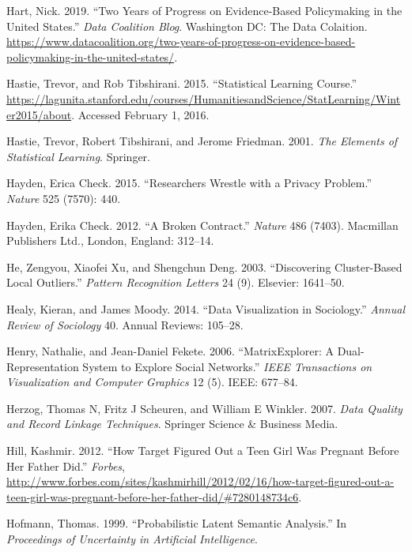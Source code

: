 \documentclass[]{krantz}
\begin{document}
\hypertarget{ref-Hart}{}
Hart, Nick. 2019. ``Two Years of Progress on Evidence-Based Policymaking
in the United States.'' \emph{Data Coalition Blog}. Washington DC: The
Data Colaition.
\url{https://www.datacoalition.org/two-years-of-progress-on-evidence-based-policymaking-in-the-united-states/}.

\hypertarget{ref-SLcourse}{}
Hastie, Trevor, and Rob Tibshirani. 2015. ``Statistical Learning
Course.''
\url{https://lagunita.stanford.edu/courses/HumanitiesandScience/StatLearning/Winter2015/about}.
Accessed February 1, 2016.

\hypertarget{ref-HastieTibshirani}{}
Hastie, Trevor, Robert Tibshirani, and Jerome Friedman. 2001. \emph{The
Elements of Statistical Learning}. Springer.

\hypertarget{ref-check2015researchers}{}
Hayden, Erica Check. 2015. ``Researchers Wrestle with a Privacy
Problem.'' \emph{Nature} 525 (7570): 440.

\hypertarget{ref-hayden2012broken}{}
Hayden, Erika Check. 2012. ``A Broken Contract.'' \emph{Nature} 486
(7403). Macmillan Publishers Ltd., London, England: 312--14.

\hypertarget{ref-he2003discovering}{}
He, Zengyou, Xiaofei Xu, and Shengchun Deng. 2003. ``Discovering
Cluster-Based Local Outliers.'' \emph{Pattern Recognition Letters} 24
(9). Elsevier: 1641--50.

\hypertarget{ref-healy2014data}{}
Healy, Kieran, and James Moody. 2014. ``Data Visualization in
Sociology.'' \emph{Annual Review of Sociology} 40. Annual Reviews:
105--28.

\hypertarget{ref-henry2006matrixexplorer}{}
Henry, Nathalie, and Jean-Daniel Fekete. 2006. ``MatrixExplorer: A
Dual-Representation System to Explore Social Networks.'' \emph{IEEE
Transactions on Visualization and Computer Graphics} 12 (5). IEEE:
677--84.

\hypertarget{ref-herzog2007data}{}
Herzog, Thomas N, Fritz J Scheuren, and William E Winkler. 2007.
\emph{Data Quality and Record Linkage Techniques}. Springer Science \&
Business Media.

\hypertarget{ref-hill2012target}{}
Hill, Kashmir. 2012. ``How Target Figured Out a Teen Girl Was Pregnant
Before Her Father Did.'' \emph{Forbes},
\url{http://www.forbes.com/sites/kashmirhill/2012/02/16/how-target-figured-out-a-teen-girl-was-pregnant-before-her-father-did/\#7280148734c6}.

\hypertarget{ref-hofmann-99}{}
Hofmann, Thomas. 1999. ``Probabilistic Latent Semantic Analysis.'' In
\emph{Proceedings of Uncertainty in Artificial Intelligence}.
\end{document}
